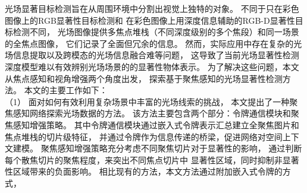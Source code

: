 

%
%
%
%
%
%
%
光场显著目标检测旨在从周围环境中分割出视觉上独特的对象。
不同于只在彩色图像上的RGB显著性目标检测和
在彩色图像上用深度信息辅助的RGB-D显著性目标检测不同，
光场图像提供多焦点堆栈（不同深度级别的多个焦段）和同一场景的全焦点图像，
它们记录了全面但冗余的信息。
然而，实际应用中存在复杂的光场信息提取以及跨模态的光场信息融合难等问题，
这导致了当前光场显著性检测深度模型难以有效辨别光场场景的的显著性物体表示。
为了解决这些问题，本文从焦点感知和视角增强两个角度出发，
探索基于聚焦感知的光场显著性检测方法。
本文的主要工作如下：
\\
%
%
%
%
\indent
%
%
（1）
%
%
面对如何有效利用复杂场景中丰富的光场线索的挑战，
本文提出了一种聚焦感知网络探索光场数据的方法。
该方法主要包含两个部分：令牌通信模块和聚焦感知增强策略。
其中令牌通信模块通过嵌入式令牌表示汇总建立全聚焦图片和焦点堆栈的切片级特征，
并通过令牌作为信息传递的桥梁，促进网络对空间上下文建模。
聚焦感知增强策略充分考虑不同聚焦切片对于显著性的影响，
通过判断每个散焦切片的聚焦程度，来突出不同焦点切片中
显著性区域，同时抑制非显著性区域带来的负面影响。
相比现有的方法，本文方法通过附加嵌入式令牌的方式，
